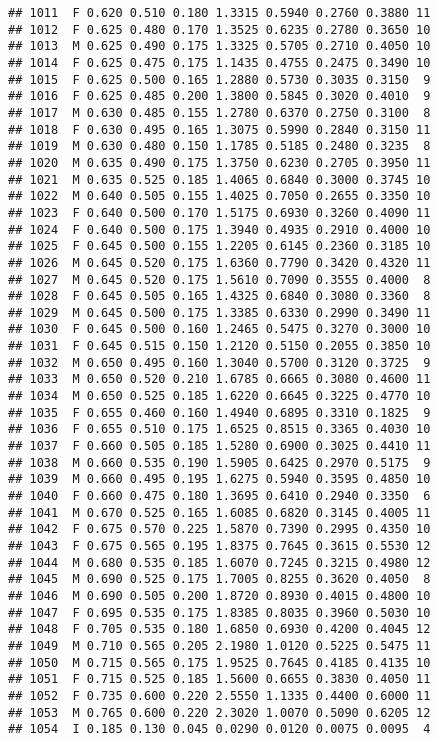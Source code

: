 \documentclass[
]{article}
\begin{document}
\begin{verbatim}
## 1011  F 0.620 0.510 0.180 1.3315 0.5940 0.2760 0.3880 11
## 1012  F 0.625 0.480 0.170 1.3525 0.6235 0.2780 0.3650 10
## 1013  M 0.625 0.490 0.175 1.3325 0.5705 0.2710 0.4050 10
## 1014  F 0.625 0.475 0.175 1.1435 0.4755 0.2475 0.3490 10
## 1015  F 0.625 0.500 0.165 1.2880 0.5730 0.3035 0.3150  9
## 1016  F 0.625 0.485 0.200 1.3800 0.5845 0.3020 0.4010  9
## 1017  M 0.630 0.485 0.155 1.2780 0.6370 0.2750 0.3100  8
## 1018  F 0.630 0.495 0.165 1.3075 0.5990 0.2840 0.3150 11
## 1019  M 0.630 0.480 0.150 1.1785 0.5185 0.2480 0.3235  8
## 1020  M 0.635 0.490 0.175 1.3750 0.6230 0.2705 0.3950 11
## 1021  M 0.635 0.525 0.185 1.4065 0.6840 0.3000 0.3745 10
## 1022  M 0.640 0.505 0.155 1.4025 0.7050 0.2655 0.3350 10
## 1023  F 0.640 0.500 0.170 1.5175 0.6930 0.3260 0.4090 11
## 1024  F 0.640 0.500 0.175 1.3940 0.4935 0.2910 0.4000 10
## 1025  F 0.645 0.500 0.155 1.2205 0.6145 0.2360 0.3185 10
## 1026  M 0.645 0.520 0.175 1.6360 0.7790 0.3420 0.4320 11
## 1027  M 0.645 0.520 0.175 1.5610 0.7090 0.3555 0.4000  8
## 1028  F 0.645 0.505 0.165 1.4325 0.6840 0.3080 0.3360  8
## 1029  M 0.645 0.500 0.175 1.3385 0.6330 0.2990 0.3490 11
## 1030  F 0.645 0.500 0.160 1.2465 0.5475 0.3270 0.3000 10
## 1031  F 0.645 0.515 0.150 1.2120 0.5150 0.2055 0.3850 10
## 1032  M 0.650 0.495 0.160 1.3040 0.5700 0.3120 0.3725  9
## 1033  M 0.650 0.520 0.210 1.6785 0.6665 0.3080 0.4600 11
## 1034  M 0.650 0.525 0.185 1.6220 0.6645 0.3225 0.4770 10
## 1035  F 0.655 0.460 0.160 1.4940 0.6895 0.3310 0.1825  9
## 1036  F 0.655 0.510 0.175 1.6525 0.8515 0.3365 0.4030 10
## 1037  F 0.660 0.505 0.185 1.5280 0.6900 0.3025 0.4410 11
## 1038  M 0.660 0.535 0.190 1.5905 0.6425 0.2970 0.5175  9
## 1039  M 0.660 0.495 0.195 1.6275 0.5940 0.3595 0.4850 10
## 1040  F 0.660 0.475 0.180 1.3695 0.6410 0.2940 0.3350  6
## 1041  M 0.670 0.525 0.165 1.6085 0.6820 0.3145 0.4005 11
## 1042  F 0.675 0.570 0.225 1.5870 0.7390 0.2995 0.4350 10
## 1043  F 0.675 0.565 0.195 1.8375 0.7645 0.3615 0.5530 12
## 1044  M 0.680 0.535 0.185 1.6070 0.7245 0.3215 0.4980 12
## 1045  M 0.690 0.525 0.175 1.7005 0.8255 0.3620 0.4050  8
## 1046  M 0.690 0.505 0.200 1.8720 0.8930 0.4015 0.4800 10
## 1047  F 0.695 0.535 0.175 1.8385 0.8035 0.3960 0.5030 10
## 1048  F 0.705 0.535 0.180 1.6850 0.6930 0.4200 0.4045 12
## 1049  M 0.710 0.565 0.205 2.1980 1.0120 0.5225 0.5475 11
## 1050  M 0.715 0.565 0.175 1.9525 0.7645 0.4185 0.4135 10
## 1051  F 0.715 0.525 0.185 1.5600 0.6655 0.3830 0.4050 11
## 1052  F 0.735 0.600 0.220 2.5550 1.1335 0.4400 0.6000 11
## 1053  M 0.765 0.600 0.220 2.3020 1.0070 0.5090 0.6205 12
## 1054  I 0.185 0.130 0.045 0.0290 0.0120 0.0075 0.0095  4

\end{verbatim}
\end{document}
